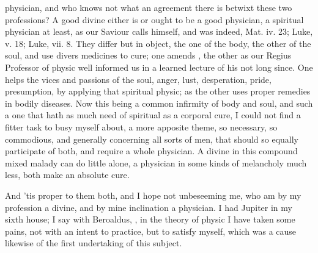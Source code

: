 physician, and who knows not what an agreement there is betwixt these two
professions? A good divine either is or ought to be a good physician, a
spiritual physician at least, as our Saviour calls himself, and was indeed,
Mat. iv. 23; Luke, v. 18; Luke, vii. 8. They differ but in object, the one of
the body, the other of the soul, and use divers medicines to cure; one amends
, the other  as
our Regius Professor of physic well informed us in a
learned lecture of his not long since. One helps the vices and passions of the
soul, anger, lust, desperation, pride, presumption, \etc{} by applying that
spiritual physic; as the other uses proper remedies in bodily diseases. Now
this being a common infirmity of body and soul, and such a one that hath as
much need of spiritual as a corporal cure, I could not find a fitter task to
busy myself about, a more apposite theme, so necessary, so commodious, and
generally concerning all sorts of men, that should so equally participate of
both, and require a whole physician. A divine in this compound mixed malady can
do little alone, a physician in some kinds of melancholy much less, both make
an absolute cure.


And 'tis proper to them both, and I hope not unbeseeming me, who am by my
profession a divine, and by mine inclination a physician. I had Jupiter in my
sixth house; I say with Beroaldus, , in the theory of physic I have taken some pains, not
with an intent to practice, but to satisfy myself, which was a cause likewise
of the first undertaking of this subject.

